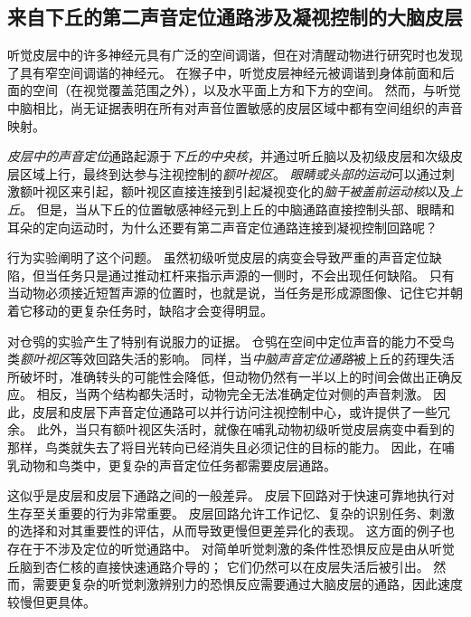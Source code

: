 \subsection{来自下丘的第二声音定位通路涉及凝视控制的大脑皮层}

听觉皮层中的许多神经元具有广泛的空间调谐，但在对清醒动物进行研究时也发现了具有窄空间调谐的神经元。
在猴子中，听觉皮层神经元被调谐到身体前面和后面的空间（在视觉覆盖范围之外），以及水平面上方和下方的空间。
然而，与听觉中脑相比，尚无证据表明在所有对声音位置敏感的皮层区域中都有空间组织的声音映射。


\textit{皮层中的声音定位}通路起源于\textit{下丘的中央核}，并通过听丘脑以及初级皮层和次级皮层区域上行，最终到达参与注视控制的\textit{额叶视区}。
\textit{眼睛或头部的运动}可以通过刺激额叶视区来引起，额叶视区直接连接到引起凝视变化的\textit{脑干被盖前运动核}以及\textit{上丘}。
但是，当从下丘的位置敏感神经元到上丘的中脑通路直接控制头部、眼睛和耳朵的定向运动时，为什么还要有第二声音定位通路连接到凝视控制回路呢？


行为实验阐明了这个问题。
虽然初级听觉皮层的病变会导致严重的声音定位缺陷，但当任务只是通过推动杠杆来指示声源的一侧时，不会出现任何缺陷。
只有当动物必须接近短暂声源的位置时，也就是说，当任务是形成源图像、记住它并朝着它移动的更复杂任务时，缺陷才会变得明显。



对仓鸮的实验产生了特别有说服力的证据。
仓鸮在空间中定位声音的能力不受鸟类\textit{额叶视区}等效回路失活的影响。
同样，当\textit{中脑声音定位通路}被上丘的药理失活所破坏时，准确转头的可能性会降低，但动物仍然有一半以上的时间会做出正确反应。
相反，当两个结构都失活时，动物完全无法准确定位对侧的声音刺激。
因此，皮层和皮层下声音定位通路可以并行访问注视控制中心，或许提供了一些冗余。
此外，当只有额叶视区失活时，就像在哺乳动物初级听觉皮层病变中看到的那样，鸟类就失去了将目光转向已经消失且必须记住的目标的能力。
因此，在哺乳动物和鸟类中，更复杂的声音定位任务都需要皮层通路。


这似乎是皮层和皮层下通路之间的一般差异。
皮层下回路对于快速可靠地执行对生存至关重要的行为非常重要。
皮层回路允许工作记忆、复杂的识别任务、刺激的选择和对其重要性的评估，从而导致更慢但更差异化的表现。
这方面的例子也存在于不涉及定位的听觉通路中。
对简单听觉刺激的条件性恐惧反应是由从听觉丘脑到杏仁核的直接快速通路介导的；
它们仍然可以在皮层失活后被引出。
然而，需要更复杂的听觉刺激辨别力的恐惧反应需要通过大脑皮层的通路，因此速度较慢但更具体。




